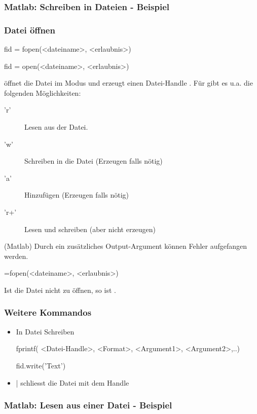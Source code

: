 \documentclass[hyperref={xetex}]{beamer}
\begin{document}
%
\begin{frame}[fragile]\frametitle{Matlab: Schreiben in Dateien - Beispiel}
\end{frame}
%
%
\begin{frame}[fragile]\frametitle{Datei öffnen}
\begin{matlabin}
fid = fopen(<dateiname>, <erlaubnis>)
\end{matlabin}
\begin{pyin}
fid = open(<dateiname>, <erlaubnis>)  
\end{pyin}

 öffnet die Datei  im Modus
   und erzeugt einen
  Datei-Handle . Für  gibt es u.a. die folgenden
  Möglichkeiten:
\begin{description}
\item ['r']  Lesen aus der Datei.
\item ['w']  Schreiben in die Datei (Erzeugen falls nötig)
\item ['a']  Hinzufügen (Erzeugen falls nötig)
\item ['r+'] Lesen und schreiben (aber nicht erzeugen) 
\end{description}
(Matlab) Durch ein  zusätzliches Output-Argument können Fehler aufgefangen
  werden. 
\begin{matlabin}
=fopen(<dateiname>, <erlaubnis>)
\end{matlabin}
Ist  die Datei nicht zu öffnen, so ist . 
\end{frame}
%
%
\begin{frame}[fragile]\frametitle{Weitere Kommandos}
\begin{itemize}
\item In Datei Schreiben
\begin{matlabin}
fprintf( <Datei-Handle>, <Format>, <Argument1>, <Argument2>,..)
\end{matlabin}
\begin{pyin}
fid.write('Text')
\end{pyin}
  \item {} |  schliesst die Datei mit dem Handle 
\end{itemize}
\end{frame}
%
%
\begin{frame}[fragile]\frametitle{Matlab: Lesen aus einer Datei - Beispiel}
\end{frame}
\end{document}
